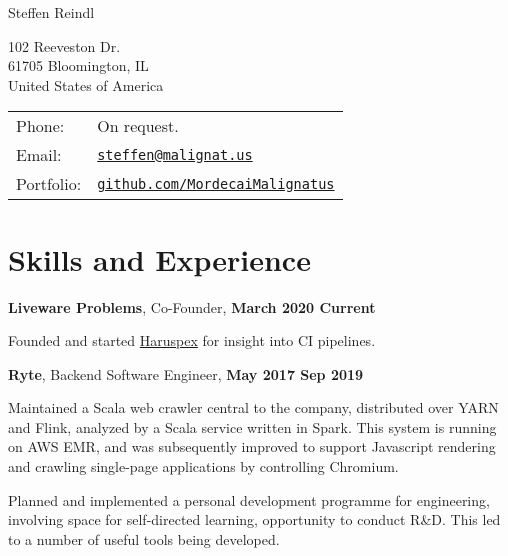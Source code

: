 \documentclass[a4paper]{article}
\def\name{Steffen Reindl}
\renewenvironment{itemize}{
  \begin{list}{}{
      \setlength{\leftmargin}{1.5em}
      \setlength{\itemsep}{10pt}
  }
}{
  \end{list}
}
\begin{document}
{\huge \name}
\vspace{0.25in}

\begin{minipage}{0.45\linewidth}
  102 Reeveston Dr.\\
  61705 Bloomington, IL\\
  United States of America
\end{minipage}
\begin{minipage}{0.45\linewidth}
  \begin{tabular}{ll}
    Phone: & On request. \\
    Email: & \href{mailto:steffen@malignat.us}{\tt steffen@malignat.us} \\
    Portfolio: & \href{https://github.com/MordecaiMalignatus/}{\tt github.com/MordecaiMalignatus}
  \end{tabular}
\end{minipage}

\section*{Skills and Experience}

\begin{itemize}
\item \textbf{Liveware Problems}, Co-Founder, \textbf{March 2020 {\textendash} Current}
  \begin{itemize}
    \item Founded and started \href{https://haruspex.dev}{Haruspex} for insight
     into CI pipelines.
  \end{itemize}
\item \textbf{Ryte}, Backend Software Engineer, \textbf{May 2017 {\textendash} Sep 2019}
        \begin{itemize}

            \item Maintained a Scala web crawler central to the company,
              distributed over YARN and Flink, analyzed by a Scala service
              written in Spark. This system is running on AWS EMR, and was
              subsequently improved to support Javascript rendering and crawling
              single-page applications by controlling Chromium.
            \item Planned and implemented a personal development programme for
              engineering, involving space for self-directed learning,
              opportunity to conduct R\&D. This led to a number of useful tools
              being developed.
        \end{itemize}
\end{itemize}
\end{document}
